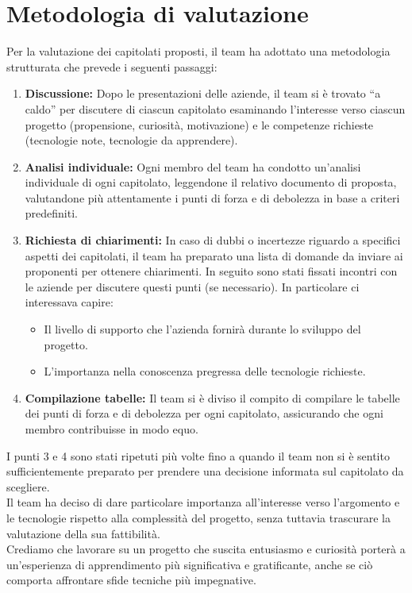 \documentclass[a4paper,11pt]{article}
\begin{document}
\newpage
\tableofcontents

\newpage
\section{Metodologia di valutazione}
Per la valutazione dei capitolati proposti, il team ha adottato una metodologia strutturata che prevede i seguenti passaggi:
\begin{enumerate}
\item \textbf{Discussione:} Dopo le presentazioni delle aziende, il team si è trovato ``a caldo'' per discutere di ciascun capitolato esaminando l'interesse verso ciascun progetto (propensione, curiosità, motivazione) e le competenze richieste (tecnologie note, tecnologie da apprendere).
\item \textbf{Analisi individuale:} Ogni membro del team ha condotto un'analisi individuale di ogni capitolato, leggendone il relativo documento di proposta, valutandone più attentamente i punti di forza e di debolezza in base a criteri predefiniti.
\item \textbf{Richiesta di chiarimenti:} In caso di dubbi o incertezze riguardo a specifici aspetti dei capitolati, il team ha preparato una lista di domande da inviare ai proponenti per ottenere chiarimenti. In seguito sono stati fissati incontri con le aziende per discutere questi punti (se necessario).
  In particolare ci interessava capire:
  \begin{itemize}
    \item Il livello di supporto che l'azienda fornirà durante lo sviluppo del progetto.
    \item L'importanza nella conoscenza pregressa delle tecnologie richieste.
  \end{itemize}
\item \textbf{Compilazione tabelle:} Il team si è diviso il compito di compilare le tabelle dei punti di forza e di debolezza per ogni capitolato, assicurando che ogni membro contribuisse in modo equo.
\end{enumerate}
I punti 3 e 4 sono stati ripetuti più volte fino a quando il team non si è sentito sufficientemente preparato per prendere una decisione informata sul capitolato da scegliere.\\
Il team ha deciso di dare particolare importanza all'interesse verso l'argomento e le tecnologie rispetto alla complessità del progetto, senza tuttavia trascurare la valutazione della sua fattibilità.\\
Crediamo che lavorare su un progetto che suscita entusiasmo e curiosità porterà a un'esperienza di apprendimento più significativa e gratificante, anche se ciò comporta affrontare sfide tecniche più impegnative.
\end{document}
